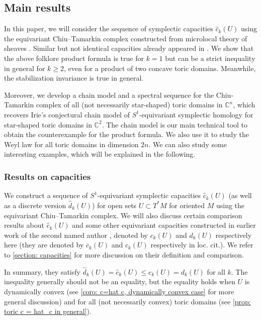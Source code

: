 \documentclass[11pt]{amsart}
\numberwithin{equation}{section}
\theoremstyle{plain}
\theoremstyle{definition}
\theoremstyle{remark}
\newcommand{\bC} { {\mathbb{C}}}
\begin{document}
\subsection{Main results}

In this paper, we will consider the sequence of symplectic capacities $\widehat{c}_k(U)$ using the equivariant Chiu--Tamarkin complex \cite{mc-tamarkin,chiu2017} constructed from microlocal theory of sheaves \cite{KS90}. Similar but not identical capacities already appeared in \cite{Capacities2021, CyclicZHANG}. We show that the above folklore product formula is true for $k=1$ but can be a strict inequality in general for $k \geq 2$, even for a product of two concave toric domains. Meanwhile, the stabilization invariance is true in general.

Moreover, we develop a chain model and a spectral sequence for the Chiu-Tamarkin complex of all (not necessarily star-shaped) toric domains in $\bC^n$, which recovers Irie's conjectural chain model of $S^1$-equivariant symplectic homology for star-shaped toric domains in $\bC^2$. The chain model is our main technical tool to obtain the counterexample for the product formula. We also use it to study the Weyl law for all toric domains in dimension $2n$. We can also study some interesting examples, which will be explained in the following.




\subsubsection{Results on capacities}
We construct a sequence of $ S^1$-equivariant symplectic capacities $\widehat{c}_k(U)$ (as well as a discrete version $\widehat{d}_k(U)$) for open sets $U\subset T^*M$ for oriented $M$ using the equivariant Chiu--Tamarkin complex. We will also discuss certain comparison results about $\widehat{c}_k(U)$ and some other equivariant capacities constructed in earlier work of the second named author \cite{Capacities2021,CyclicZHANG}, denoted by $c_k(U)$ and $d_k(U)$ respectively here (they are denoted by $\overline{c}_k(U)$ and $c_k(U)$ respectively in loc. cit.). We refer to \autoref{section: capacities} for more discussion on their definition and comparison.

In summary, they satisfy $\widehat{d}_k(U)=\widehat{c}_k(U)\leq c_k(U)= d_k(U)$ for all $k$. The inequality generally should not be an equality, but the equality holds when $U$ is dynamically convex (see \autoref{coro: c=hat c, dynamically convex case} for more general discussion) and for all (not necessarily convex) toric domains (see \autoref{prop: toric c = hat_c in general}). 
\end{document}
